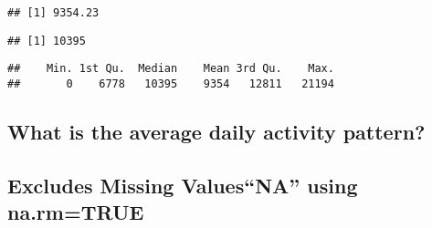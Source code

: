 \documentclass[]{article}
\newenvironment{Shaded}{\begin{snugshade}}{\end{snugshade}}
\newcommand{\KeywordTok}[1]{\textcolor[rgb]{0.13,0.29,0.53}{\textbf{#1}}}
\newcommand{\OperatorTok}[1]{\textcolor[rgb]{0.81,0.36,0.00}{\textbf{#1}}}
\newcommand{\NormalTok}[1]{#1}
\begin{document}
\begin{verbatim}
## [1] 9354.23
\end{verbatim}

\begin{Shaded}
\end{Shaded}

\begin{verbatim}
## [1] 10395
\end{verbatim}

\begin{Shaded}
\end{Shaded}

\begin{verbatim}
##    Min. 1st Qu.  Median    Mean 3rd Qu.    Max. 
##       0    6778   10395    9354   12811   21194
\end{verbatim}

\subsection{What is the average daily activity
pattern?}\label{what-is-the-average-daily-activity-pattern}

\subsection{\texorpdfstring{Excludes Missing Values``NA'' using
na.rm=TRUE}{Excludes Missing ValuesNA using na.rm=TRUE}}\label{excludes-missing-valuesna-using-na.rmtrue}
\end{document}
